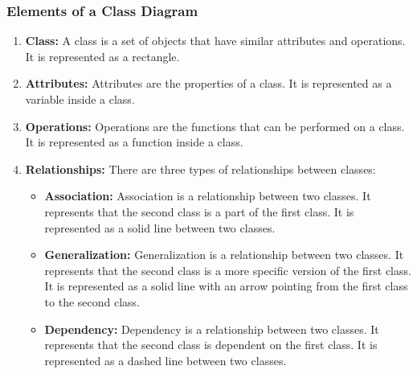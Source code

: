 \documentclass{article}
\begin{document}
\subsubsection{\textbf{Elements of a Class Diagram}}
\begin{enumerate}
	\item \textbf{Class:} A class is a set of objects that have similar attributes and operations. It is represented as a rectangle.
	\item \textbf{Attributes:} Attributes are the properties of a class. It is represented as a variable inside a class.
	\item \textbf{Operations:} Operations are the functions that can be performed on a class. It is represented as a function inside a class.
	\item \textbf{Relationships:} There are three types of relationships between classes:
	\begin{itemize}
		\item \textbf{Association:} Association is a relationship between two classes. It represents that the second class is a
		part of the first class. It is represented as a solid line between two classes.
		\item \textbf{Generalization:} Generalization is a relationship between two classes. It represents that the second class is a more specific version of the first class. It is represented as a solid line with an arrow pointing from the first class to the second class.
		\item \textbf{Dependency:} Dependency is a relationship between two classes. It represents that the second class is dependent on the first class. It is represented as a dashed line between two classes.
	\end{itemize}
	\begin{center}

\end{center}
\end{enumerate}
\end{document}

